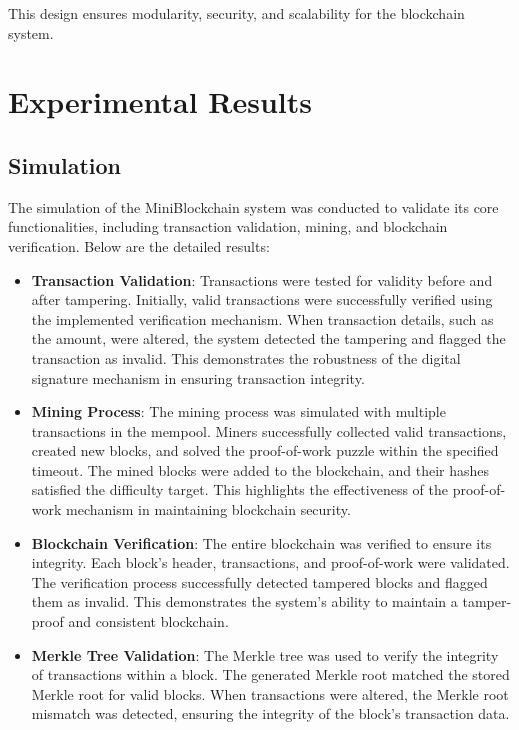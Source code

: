 \documentclass[12pt]{article}
\begin{document}
This design ensures modularity, security, and scalability for the blockchain system.

\section{Experimental Results}
\subsection{Simulation}
The simulation of the MiniBlockchain system was conducted to validate its core functionalities, including transaction validation, mining, and blockchain verification. Below are the detailed results:

\begin{itemize}
    \item \textbf{Transaction Validation}: Transactions were tested for validity before and after tampering. Initially, valid transactions were successfully verified using the implemented verification mechanism. When transaction details, such as the amount, were altered, the system detected the tampering and flagged the transaction as invalid. This demonstrates the robustness of the digital signature mechanism in ensuring transaction integrity.

    \item \textbf{Mining Process}: The mining process was simulated with multiple transactions in the mempool. Miners successfully collected valid transactions, created new blocks, and solved the proof-of-work puzzle within the specified timeout. The mined blocks were added to the blockchain, and their hashes satisfied the difficulty target. This highlights the effectiveness of the proof-of-work mechanism in maintaining blockchain security.

    \item \textbf{Blockchain Verification}: The entire blockchain was verified to ensure its integrity. Each block's header, transactions, and proof-of-work were validated. The verification process successfully detected tampered blocks and flagged them as invalid. This demonstrates the system's ability to maintain a tamper-proof and consistent blockchain.

    \item \textbf{Merkle Tree Validation}: The Merkle tree was used to verify the integrity of transactions within a block. The generated Merkle root matched the stored Merkle root for valid blocks. When transactions were altered, the Merkle root mismatch was detected, ensuring the integrity of the block's transaction data.


\end{itemize}
\end{document}
